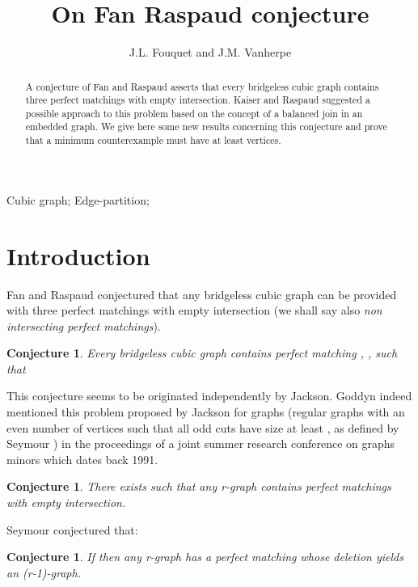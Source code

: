 \documentclass{elsart}
\theoremstyle{plain} \theoremheaderfont{\scshape}
\newtheorem{Conj}[Thm]{{\bf Conjecture}}
\begin{document}
\begin{frontmatter}




\title{On Fan Raspaud conjecture}
\author{J.L. Fouquet and J.M. Vanherpe}


\address{L.I.F.O., Facult\'e des Sciences, B.P. 6759 \\
Universit\'e d'Orl\'eans, 45067 Orl\'eans Cedex 2, FR}
\begin{abstract}
A conjecture of Fan and Raspaud \cite{FanRas} asserts that every
bridgeless cubic graph contains three perfect matchings with empty
intersection. Kaiser and Raspaud \cite{KaiRas} suggested a possible
approach to this problem based on the concept of a balanced join in
an embedded graph. We give here some new results concerning this
conjecture and prove that a minimum counterexample must have at
least  vertices.
\end{abstract}
\begin{keyword}
Cubic graph;  Edge-partition;
\end{keyword}
\end{frontmatter}




\section{Introduction}
Fan and Raspaud \cite{FanRas} conjectured that any bridgeless cubic
graph can be provided with three perfect matchings with empty
intersection (we shall say also {\em non intersecting perfect
matchings}).
\begin{Conj}\cite{FanRas} \label{Conjecture:FanRaspaud} Every
bridgeless cubic graph contains perfect matching , , 
such that

\end{Conj}

This conjecture seems to be originated independently by Jackson.
Goddyn \cite{God} indeed mentioned this problem proposed by Jackson
for graphs (regular graphs with an even number of vertices
such that all odd cuts have size at least , as defined by Seymour
\cite{Sey}) in the proceedings of a joint summer research conference
on graphs minors which dates back 1991.

\begin{Conj}\cite{God} \label{Conjecture:Jackson}There exists  such
that any r-graph contains  perfect matchings with empty
intersection.
\end{Conj}
Seymour \cite{Sey} conjectured that:
\begin{Conj}\cite{Sey} \label{Conjecture:Seymour}If  then any
r-graph has a perfect matching whose deletion yields an (r-1)-graph.
\end{Conj}
\end{document}
